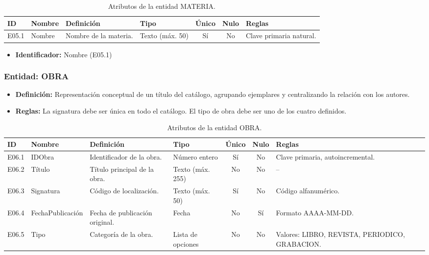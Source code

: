 \begin{table}[H]
	\centering
	\caption{Atributos de la entidad MATERIA.}
	\label{tab:dict_materia}
	\small
	\begin{tabularx}{\textwidth}{l l X l c c X}
		\toprule
		\textbf{ID} & \textbf{Nombre} & \textbf{Definición} & \textbf{Tipo} & \textbf{Único} & \textbf{Nulo} & \textbf{Reglas} \\
		\midrule
		E05.1 & Nombre & Nombre de la materia. & Texto (máx. 50) & Sí & No & Clave primaria natural. \\
		\bottomrule
	\end{tabularx}
\end{table}

\begin{itemize}
	\item\textbf{Identificador:} Nombre (E05.1)
\end{itemize}

\subsubsection{Entidad: OBRA}
\begin{itemize}
	\item\textbf{Definición:} Representación conceptual de un título del catálogo, agrupando ejemplares y centralizando la relación con los autores.
	\item\textbf{Reglas:} La signatura debe ser única en todo el catálogo. El tipo de obra debe ser uno de los cuatro definidos.
\end{itemize}

\begin{table}[H]
	\centering
	\caption{Atributos de la entidad OBRA.}
	\label{tab:dict_obra}
	\small
	\begin{tabularx}{\textwidth}{l l X l c c X}
		\toprule
		\textbf{ID} & \textbf{Nombre} & \textbf{Definición} & \textbf{Tipo} & \textbf{Único} & \textbf{Nulo} & \textbf{Reglas} \\
		\midrule
		E06.1 & IDObra & Identificador de la obra. & Número entero & Sí & No & Clave primaria, autoincremental. \\
		\addlinespace
		E06.2 & Título & Título principal de la obra. & Texto (máx. 255) & No & No & -- \\
		\addlinespace
		E06.3 & Signatura & Código de localización. & Texto (máx. 50) & Sí & No & Código alfanumérico. \\
		\addlinespace
		E06.4 & FechaPublicación & Fecha de publicación original. & Fecha & No & Sí & Formato AAAA-MM-DD. \\
		\addlinespace
		E06.5 & Tipo & Categoría de la obra. & Lista de opciones & No & No & Valores: LIBRO, REVISTA, PERIODICO, GRABACION. \\
		\bottomrule
	\end{tabularx}
\end{table}

